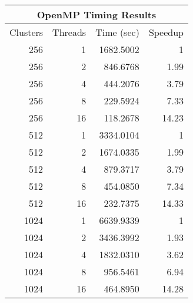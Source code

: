 \documentclass[a4paper]{article}
\begin{document}
\begin{center}
  \begin{tabular}{| r r r r |}
    \hline
    \multicolumn{4}{|c|}{OpenMP Timing Results} \\
    \hline
    Clusters & Threads & Time (sec) & Speedup\\
    \hline
    256 & 1 & 1682.5002 & 1\\
    256 & 2 & 846.6768 & 1.99 \\
    256 & 4 & 444.2076 & 3.79 \\
    256 & 8 & 229.5924 & 7.33 \\
    256 & 16 & 118.2678 & 14.23 \\
    \hline
    512 & 1 & 3334.0104 & 1 \\
    512 & 2 & 1674.0335 & 1.99 \\
    512 & 4 & 879.3717 & 3.79 \\
    512 & 8 & 454.0850 & 7.34 \\
    512 & 16 & 232.7375 & 14.33 \\
    \hline
    1024 & 1 & 6639.9339 & 1 \\
    1024 & 2 & 3436.3992 & 1.93 \\
    1024 & 4 & 1832.0310 & 3.62 \\
    1024 & 8 & 956.5461 & 6.94 \\
    1024 & 16 & 464.8950 & 14.28 \\
    \hline
  \end{tabular}
\end{center}
\end{document}
